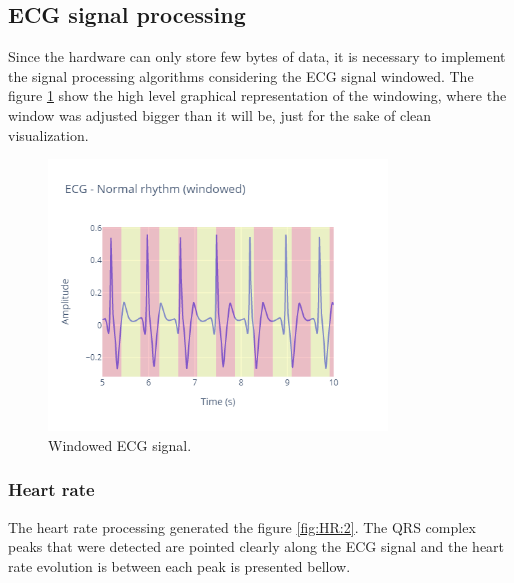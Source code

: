 \subsection{ECG signal processing}

Since the hardware can only store few bytes of data, it is necessary to implement the signal processing algorithms considering the ECG signal windowed. The figure \ref{fig:HR:1} show the high level graphical representation of the windowing, where the window was adjusted bigger than it will be, just for the sake of clean visualization.

\begin{figure}[h!] 
    \centering
    \includegraphics[width=9cm]{images/heart_rate/windowing_software.png}
    \caption{Windowed ECG signal.}
    \label{fig:HR:1}
\end{figure}

\subsubsection{Heart rate}

The heart rate processing generated the figure \ref{fig:HR:2}. The QRS complex peaks that were detected are pointed clearly along the ECG signal and the heart rate evolution is between each peak is presented bellow.

